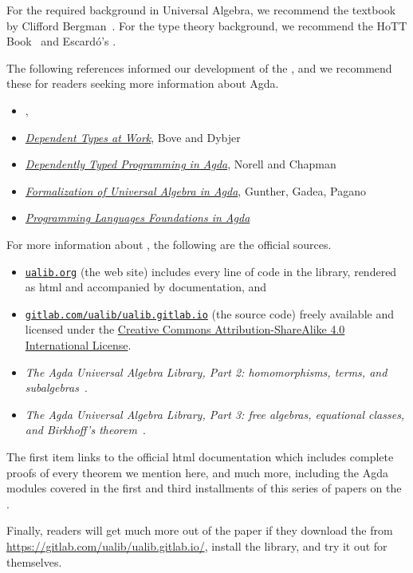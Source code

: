 For the required background in Universal Algebra, we recommend the textbook by Clifford Bergman~\cite{Bergman:2012}.  For the type theory background, we recommend the HoTT Book~\cite{HoTT} and Escard\'o's \ufcourse.

The following references informed our development of the \ualib, and we recommend these for readers seeking more information about Agda.
\begin{itemize}
\item \textit{\ufcourse}, \escardo~\cite{MHE}
\item \href{http://www.cse.chalmers.se/~peterd/papers/DependentTypesAtWork.pdf}{\it Dependent Types at Work}, Bove and Dybjer~\cite{Bove:2009}
\item \href{http://www.cse.chalmers.se/~ulfn/papers/afp08/tutorial.pdf}{\it Dependently Typed Programming in Agda}, Norell and Chapman~\cite{Norell:2008}
\item \href{http://www.sciencedirect.com/science/article/pii/S1571066118300768}{\it Formalization of Universal Algebra in Agda}, Gunther, Gadea, Pagano~\cite{Gunther:2018}
\item \href{https://plfa.github.io/}{\it Programming Languages Foundations in Agda}~\cite{Wadler:2020}
\end{itemize}

For more information about \agdaualib, the following are the official sources.
\begin{itemize}
  \item \href{https://ualib.gitlab.io}{\texttt{ualib.org}} (the web site) includes every line of code in the library, rendered as html and accompanied by documentation, and
  \item \href{https://gitlab.com/ualib/ualib.gitlab.io}{\texttt{gitlab.com/ualib/ualib.gitlab.io}} (the source code) freely available and licensed under the \href{https://creativecommons.org/licenses/by-sa/4.0/}{Creative Commons Attribution-ShareAlike 4.0 International License}.
  \item \emph{The Agda Universal Algebra Library, Part 2: homomorphisms, terms, and subalgebras}~\cite{DeMeo:2021-2}. 
\item \emph{The Agda Universal Algebra Library, Part 3: free algebras, equational classes, and Birkhoff's theorem}~\cite{DeMeo:2021-3}.
\end{itemize}
The first item links to the official \ualib html documentation which includes complete proofs of every theorem we mention here, and much more, including the Agda modules covered in the first and third installments of this series of papers on the \ualib.

Finally, readers will get much more out of the paper if they download the \ualib from \url{https://gitlab.com/ualib/ualib.gitlab.io/}, install the library, and try it out for themselves.
